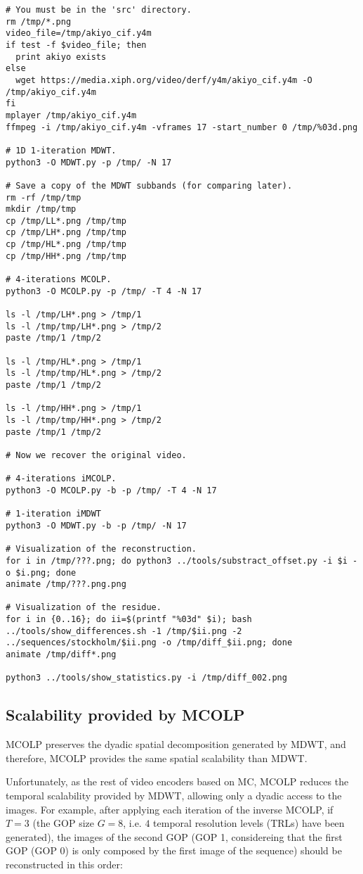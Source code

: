 \begin{verbatim}
# You must be in the 'src' directory.
rm /tmp/*.png
video_file=/tmp/akiyo_cif.y4m
if test -f $video_file; then
  print akiyo exists
else
  wget https://media.xiph.org/video/derf/y4m/akiyo_cif.y4m -O /tmp/akiyo_cif.y4m
fi
mplayer /tmp/akiyo_cif.y4m
ffmpeg -i /tmp/akiyo_cif.y4m -vframes 17 -start_number 0 /tmp/%03d.png

# 1D 1-iteration MDWT.
python3 -O MDWT.py -p /tmp/ -N 17

# Save a copy of the MDWT subbands (for comparing later).
rm -rf /tmp/tmp
mkdir /tmp/tmp
cp /tmp/LL*.png /tmp/tmp
cp /tmp/LH*.png /tmp/tmp
cp /tmp/HL*.png /tmp/tmp
cp /tmp/HH*.png /tmp/tmp

# 4-iterations MCOLP.
python3 -O MCOLP.py -p /tmp/ -T 4 -N 17

ls -l /tmp/LH*.png > /tmp/1
ls -l /tmp/tmp/LH*.png > /tmp/2
paste /tmp/1 /tmp/2

ls -l /tmp/HL*.png > /tmp/1
ls -l /tmp/tmp/HL*.png > /tmp/2
paste /tmp/1 /tmp/2

ls -l /tmp/HH*.png > /tmp/1
ls -l /tmp/tmp/HH*.png > /tmp/2
paste /tmp/1 /tmp/2

# Now we recover the original video.

# 4-iterations iMCOLP.
python3 -O MCOLP.py -b -p /tmp/ -T 4 -N 17

# 1-iteration iMDWT
python3 -O MDWT.py -b -p /tmp/ -N 17

# Visualization of the reconstruction.
for i in /tmp/???.png; do python3 ../tools/substract_offset.py -i $i -o $i.png; done
animate /tmp/???.png.png

# Visualization of the residue.
for i in {0..16}; do ii=$(printf "%03d" $i); bash ../tools/show_differences.sh -1 /tmp/$ii.png -2 ../sequences/stockholm/$ii.png -o /tmp/diff_$ii.png; done
animate /tmp/diff*.png

python3 ../tools/show_statistics.py -i /tmp/diff_002.png
\end{verbatim}

\subsection{Scalability provided by MCOLP}
MCOLP preserves the dyadic spatial decomposition generated by MDWT,
and therefore, MCOLP provides the same spatial scalability than MDWT.

Unfortunately, as the rest of video encoders based on MC, MCOLP
reduces the temporal scalability provided by MDWT, allowing only a
dyadic access to the images. For example, after applying each
iteration of the inverse MCOLP, if $T=3$ (the GOP size $G=8$, i.e. $4$
temporal resolution levels (TRLs) have been generated), the images of
the second GOP (GOP 1, considereing that the first GOP (GOP 0) is only
composed by the first image of the sequence) should be reconstructed
in this order:


